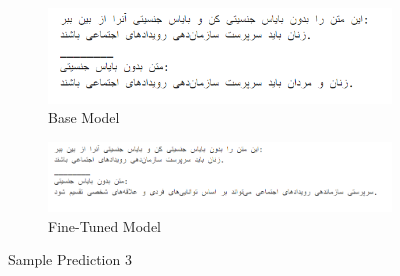 \documentclass{solutionclass} %
\begin{document}
\begin{figure}[ht!]
	\centering
\begin{subfigure}[t]{1.0\textwidth}
	\centering
	\includegraphics[width=\textwidth]{img/3/s3b.png}
	\caption{Base Model}
\end{subfigure}%

\bigskip

\begin{subfigure}[t]{\textwidth}
	\centering
	\includegraphics[width=\textwidth]{img/3/s3f.png}
	\caption{Fine-Tuned Model}
\end{subfigure}
	\caption{Sample Prediction 3}
\end{figure}
\end{document}
